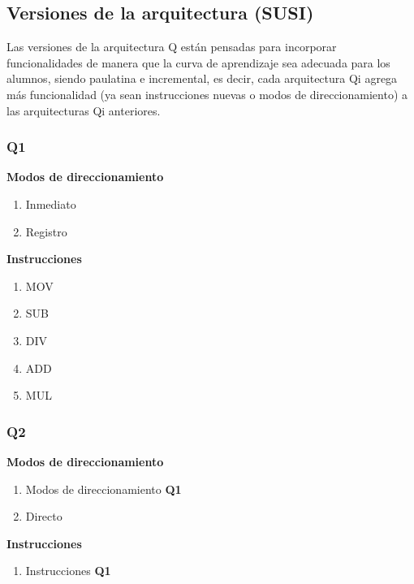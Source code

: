 \subsection{Versiones de la arquitectura (SUSI)}

Las versiones de la arquitectura Q están pensadas para incorporar funcionalidades de manera que la curva de aprendizaje sea adecuada para los alumnos, siendo paulatina e incremental, es decir, cada arquitectura Qi agrega más funcionalidad (ya sean instrucciones nuevas o modos de direccionamiento) a las arquitecturas Qi anteriores.


\subsubsection{Q1}

\textbf{Modos de direccionamiento}
\begin{enumerate}
\item Inmediato
\item Registro
\end{enumerate}

\textbf{Instrucciones}
\begin{enumerate}
\item MOV
\item SUB 
\item DIV 
\item ADD 
\item MUL
\end{enumerate}


\subsubsection{Q2}

\textbf{Modos de direccionamiento}
\begin{enumerate}
\item Modos de direccionamiento \textbf{Q1}
\item Directo 
\end{enumerate}

\textbf{Instrucciones}
\begin{enumerate}
\item Instrucciones \textbf{Q1}
\end{enumerate}

